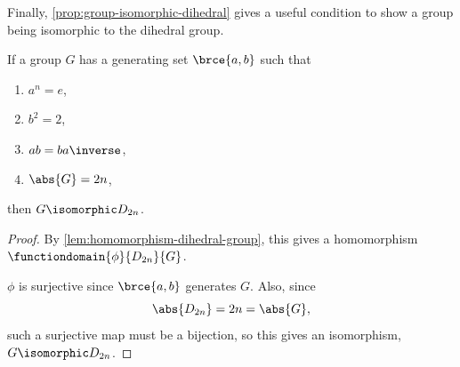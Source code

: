 Finally, \autoref{prop:group-isomorphic-dihedral} gives a useful condition to show a group being isomorphic to the dihedral group.

\begin{proposition}
    \label{prop:group-isomorphic-dihedral}%
    If a group \(G\) has a generating set \(\brce{a, b}\) such that
    \begin{enumerate}
        \item \(a^n = e\),
        \item \(b^2 = 2\),
        \item \(ab = b a \inverse\),
        \item \(\abs{G} = 2n\),
    \end{enumerate}
    then \(G \isomorphic D_{2n}\).
\end{proposition}

\begin{proof}
    By \autoref{lem:homomorphism-dihedral-group}, this gives a homomorphism \(\functiondomain{\phi}{D_{2n}}{G}\).

    \(\phi\) is surjective since \(\brce{a, b}\) generates \(G\). Also, since
    \[
        \abs{D_{2n}} = 2n = \abs{G},
    \]
    such a surjective map must be a bijection, so this gives an isomorphism, \(G \isomorphic D_{2n}\).
\end{proof}